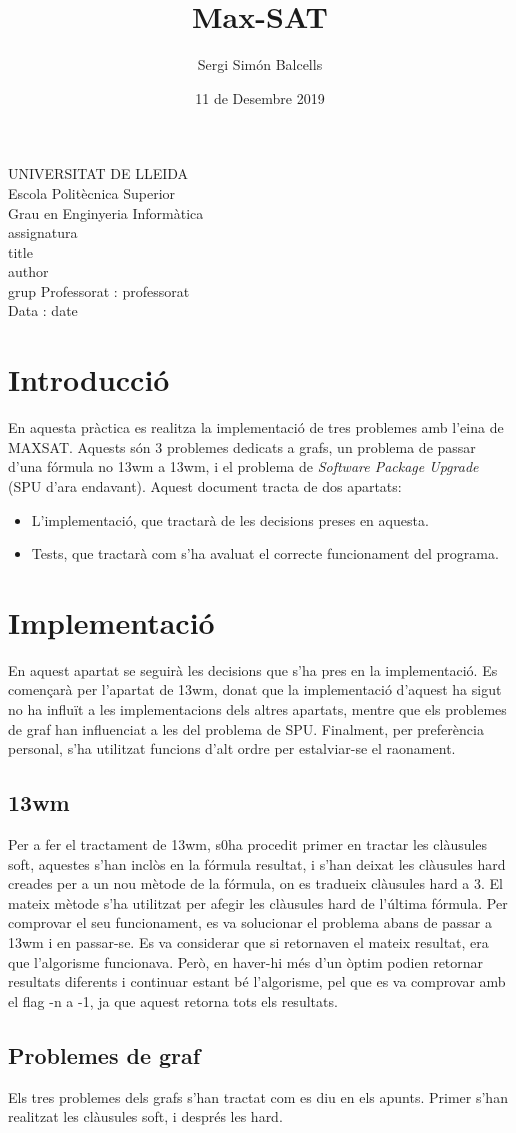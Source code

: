 \documentclass{article}
\title{Max-SAT}
\author{Sergi Simón Balcells}
\date{11 de Desembre 2019}
\renewcommand{\maketitle}{ %
	\begin{titlepage}
		\raggedright{UNIVERSITAT DE LLEIDA \\
			Escola Politècnica Superior \\
			Grau en Enginyeria Informàtica\\
			\1assignatura\\
}
		\vspace{5cm}
		\centering\huge{\5title \\}
		\vspace{3cm}
		\large{\6author} \\
		\normalsize{\3grup}
		\vfill
		Professorat : \4professorat \\
		Data : \7date
\end{titlepage}}
\begin{document}
	\maketitle
	\newpage

\section{Introducció}
En aquesta pràctica es realitza la implementació de tres problemes amb l'eina de MAXSAT.
Aquests són 3 problemes dedicats a grafs, un problema de passar d'una fórmula no 13wm a 13wm, i
el problema de \textit{Software Package Upgrade} (SPU d'ara endavant). Aquest document tracta de dos
apartats:
\begin{itemize}
	\item L'implementació, que tractarà de les decisions preses en aquesta.
	\item Tests, que tractarà com s'ha avaluat el correcte funcionament del programa.
\end{itemize}
\section{Implementació}
En aquest apartat se seguirà les decisions que s'ha pres en la implementació.
Es començarà per l'apartat de 13wm, donat que la implementació d'aquest ha sigut
no ha influït a les implementacions dels altres apartats, mentre que els problemes de 
graf han influenciat a les del problema de SPU. Finalment, per preferència personal, 
s'ha utilitzat funcions d'alt ordre per estalviar-se el raonament. 
\subsection{13wm}
Per a fer el tractament de 13wm, s0ha procedit primer en tractar les clàusules soft, aquestes
s'han inclòs en la fórmula resultat, i s'han deixat les clàusules hard creades per a un nou mètode
de la fórmula, on es tradueix clàusules hard a 3. El mateix mètode s'ha utilitzat per afegir les clàusules
hard de l'última fórmula. Per comprovar el seu funcionament, es va solucionar el problema abans de passar
a 13wm i en passar-se. Es va considerar que si retornaven el mateix resultat, era que l'algorisme funcionava. Però, 
en haver-hi més d'un òptim podien retornar resultats diferents i continuar estant bé l'algorisme, pel que es va comprovar
amb el flag -n a -1, ja que aquest retorna tots els resultats.
\subsection{Problemes de graf}
Els tres problemes dels grafs s'han tractat com es diu en els apunts. Primer s'han realitzat les clàusules soft, 
i després les hard.
\end{document}
